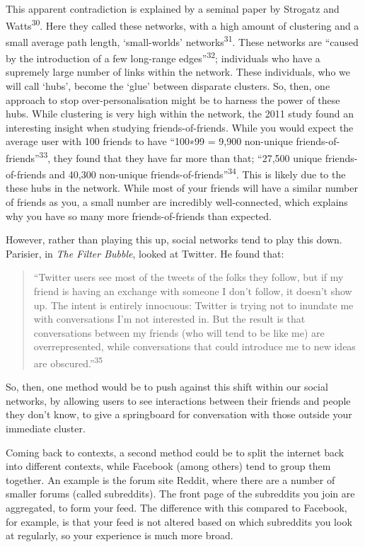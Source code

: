 \documentclass[]{article}
\begin{document}
This apparent contradiction is explained by a seminal paper by Strogatz
and Watts\textsuperscript{30}. Here they called these networks, with a
high amount of clustering and a small average path length,
`small-worlds' networks\textsuperscript{31}. These networks are ``caused
by the introduction of a few long-range edges''\textsuperscript{32};
individuals who have a supremely large number of links within the
network. These individuals, who we will call `hubs', become the `glue'
between disparate clusters. So, then, one approach to stop
over-personalisation might be to harness the power of these hubs. While
clustering is very high within the network, the 2011 study found an
interesting insight when studying friends-of-friends. While you would
expect the average user with 100 friends to have ``100∗99 = 9,900
non-unique friends-of-friends''\textsuperscript{33}, they found that
they have far more than that; ``27,500 unique friends-of-friends and
40,300 non-unique friends-of-friends''\textsuperscript{34}. This is
likely due to the these hubs in the network. While most of your friends
will have a similar number of friends as you, a small number are
incredibly well-connected, which explains why you have so many more
friends-of-friends than expected.

However, rather than playing this up, social networks tend to play this
down. Parisier, in \emph{The Filter Bubble}, looked at Twitter. He found
that:

\begin{quote}
``Twitter users see most of the tweets of the folks they follow, but if
my friend is having an exchange with someone I don't follow, it doesn't
show up. The intent is entirely innocuous: Twitter is trying not to
inundate me with conversations I'm not interested in. But the result is
that conversations between my friends (who will tend to be like me) are
overrepresented, while conversations that could introduce me to new
ideas are obscured.''\textsuperscript{35}
\end{quote}

So, then, one method would be to push against this shift within our
social networks, by allowing users to see interactions between their
friends and people they don't know, to give a springboard for
conversation with those outside your immediate cluster.

Coming back to contexts, a second method could be to split the internet
back into different contexts, while Facebook (among others) tend to
group them together. An example is the forum site Reddit, where there
are a number of smaller forums (called subreddits). The front page of
the subreddits you join are aggregated, to form your feed. The
difference with this compared to Facebook, for example, is that your
feed is not altered based on which subreddits you look at regularly, so
your experience is much more broad.
\end{document}
